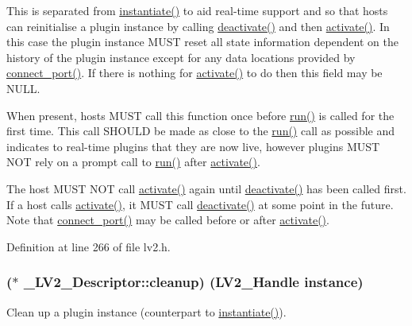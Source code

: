 This is separated from \hyperlink{struct___l_v2___descriptor_a2f7e1c335ddf27d3a0017207421fe9f5}{instantiate()} to aid real-\/time support and so that hosts can reinitialise a plugin instance by calling \hyperlink{struct___l_v2___descriptor_ab010fd53849be3de9beb99d7d936ab9c}{deactivate()} and then \hyperlink{struct___l_v2___descriptor_ad6bfac334042df6d51f4f0f7c0a72241}{activate()}. In this case the plugin instance M\+U\+ST reset all state information dependent on the history of the plugin instance except for any data locations provided by \hyperlink{struct___l_v2___descriptor_a7c6a66b45322444b14e6d0fc27da62d5}{connect\+\_\+port()}. If there is nothing for \hyperlink{struct___l_v2___descriptor_ad6bfac334042df6d51f4f0f7c0a72241}{activate()} to do then this field may be N\+U\+LL.

When present, hosts M\+U\+ST call this function once before \hyperlink{struct___l_v2___descriptor_ab137135b8024e88d5de9d252534f2b9b}{run()} is called for the first time. This call S\+H\+O\+U\+LD be made as close to the \hyperlink{struct___l_v2___descriptor_ab137135b8024e88d5de9d252534f2b9b}{run()} call as possible and indicates to real-\/time plugins that they are now live, however plugins M\+U\+ST N\+OT rely on a prompt call to \hyperlink{struct___l_v2___descriptor_ab137135b8024e88d5de9d252534f2b9b}{run()} after \hyperlink{struct___l_v2___descriptor_ad6bfac334042df6d51f4f0f7c0a72241}{activate()}.

The host M\+U\+ST N\+OT call \hyperlink{struct___l_v2___descriptor_ad6bfac334042df6d51f4f0f7c0a72241}{activate()} again until \hyperlink{struct___l_v2___descriptor_ab010fd53849be3de9beb99d7d936ab9c}{deactivate()} has been called first. If a host calls \hyperlink{struct___l_v2___descriptor_ad6bfac334042df6d51f4f0f7c0a72241}{activate()}, it M\+U\+ST call \hyperlink{struct___l_v2___descriptor_ab010fd53849be3de9beb99d7d936ab9c}{deactivate()} at some point in the future. Note that \hyperlink{struct___l_v2___descriptor_a7c6a66b45322444b14e6d0fc27da62d5}{connect\+\_\+port()} may be called before or after \hyperlink{struct___l_v2___descriptor_ad6bfac334042df6d51f4f0f7c0a72241}{activate()}. 

Definition at line 266 of file lv2.\+h.

\subsubsection[{\texorpdfstring{cleanup}{cleanup}}]{($\ast$ \+\_\+\+L\+V2\+\_\+\+Descriptor\+::cleanup) ({\bf L\+V2\+\_\+\+Handle} instance)}\hypertarget{struct___l_v2___descriptor_a5dba64bee74fd5ade089462eb20c0e43}{}\label{struct___l_v2___descriptor_a5dba64bee74fd5ade089462eb20c0e43}
Clean up a plugin instance (counterpart to \hyperlink{struct___l_v2___descriptor_a2f7e1c335ddf27d3a0017207421fe9f5}{instantiate()}).

